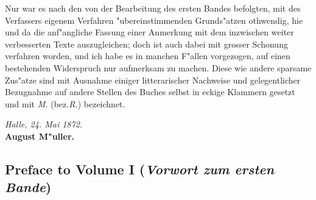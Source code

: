 \documentclass[11pt,a4paper]{article}
\newenvironment{german}{\germanfont}{}
\begin{document}
\begin{german}
\smallskip

Nur war es nach den von der Bearbeitung des ersten Bandes befolgten, mit
des Verfassers eigenem Verfahren "ubereinstimmenden Grunds"atzen
othwendig, hie und da die anf"angliche Fassung einer Anmerkung mit dem
inzwischen weiter verbesserten Texte auszugleichen; doch ist auch dabei
mit grosser Schonung verfahren worden, und ich habe es in manchen F"allen
vorgezogen, auf einen bestehenden Widerspruch nur aufmerksam zu machen.
Diese wie andere sparsame Zus"atze sind mit Ausnahme einiger
litterarischer Nachweise und gelegentlicher Bezugnahme auf andere Stellen
des Buches selbst in eckige Klammern gesetzt und mit \textit{M.} (bez.\@ \textit{R.})
bezeichnet.

\end{german}

\vspace{1em}
\begin{flushright}
\textit{Halle, 24. Mai 1872.}\\[0.3em]
\textbf{August M"uller.}
\end{flushright}

\newpage

\subsection*{Preface to Volume I (\textit{Vorwort zum ersten Bande})}
\end{document}
